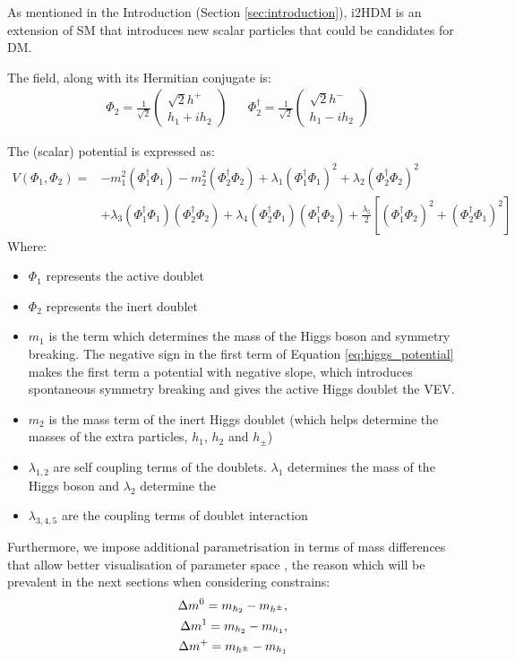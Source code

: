 \documentclass[12pt]{article}
\begin{document}
As mentioned in the Introduction (Section \ref{sec:introduction}), i2HDM is an extension of SM that introduces new scalar particles that could be candidates for DM.

The field, along with its Hermitian conjugate is:
\begin{align}
    &\Phi_2 = \frac{1}{\sqrt{2}}
        \begin{pmatrix}
            {\sqrt{2}h^+} \\
            {h_1 + ih_2 }
        \end{pmatrix}&
    &\Phi_2^\dagger = \frac{1}{\sqrt{2}} 
        \begin{pmatrix}
            {\sqrt{2}h^-} \\
            {h_1 - ih_2 }
        \end{pmatrix}
\end{align} 

The (scalar) potential is expressed as:
\begin{equation}
    \begin{split}
        V(\Phi_1, \Phi_2) =& -m_1^2(\Phi_1^\dagger\Phi_1) - m_2^2(\Phi_2^\dagger\Phi_2) + \lambda_1(\Phi_1^\dagger\Phi_1)^2 + \lambda_2(\Phi_2^\dagger\Phi_2)^2 \\
        &+ \lambda_3(\Phi_1^\dagger\Phi_1)(\Phi_2^\dagger\Phi_2) + \lambda_4(\Phi_2^\dagger\Phi_1)(\Phi_1^\dagger\Phi_2) + \frac{\lambda_5}{2}[(\Phi_1^\dagger\Phi_2)^2 + (\Phi_2^\dagger\Phi_1)^2]
        \end{split}
        \label{eq:higgs_potential}
\end{equation}
Where:
\begin{itemize}
    \item $\Phi_1$ represents the active doublet
    \item $\Phi_2$ represents the inert doublet
    \item $m_1$ is the term which determines the mass of the Higgs boson and symmetry breaking. The negative sign in the first term of Equation \ref{eq:higgs_potential} makes the first term a potential with negative slope, which introduces spontaneous symmetry breaking and gives the active Higgs doublet the VEV.
    \item $m_2$ is the mass term of the inert Higgs doublet (which helps determine the masses of the extra particles, $h_1$, $h_2$ and $h_\pm$)
    \item $\lambda_{1, 2}$ are self coupling terms of the doublets. $\lambda_1$ determines the mass of the Higgs boson and $\lambda_2$ determine the 
    \item $\lambda_{3, 4, 5}$ are the coupling terms of doublet interaction
\end{itemize}
Furthermore, we impose additional parametrisation in terms of mass differences that allow better visualisation of parameter space \cite{Belyaev_2022}, the reason which will be prevalent in the next sections when considering constrains:
\begin{align}
\label{eq:mass_diff_1}
    \Delta m^{0} = m_{h_2} - m_{h^\pm},\\ \notag
    \Delta m^1 = m_{h_2} - m_{h_1},\\ \notag
    \Delta m^+ = m_{h^\pm} - m_{h_1}
\end{align}
\end{document}
